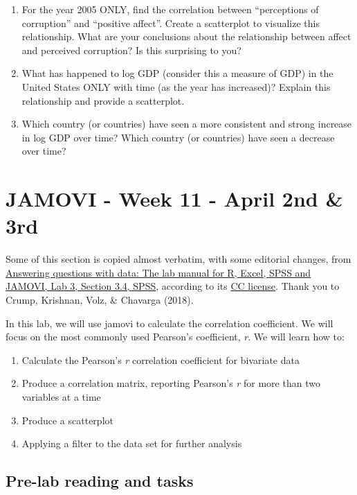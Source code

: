 \documentclass[
]{book}
\providecommand{\tightlist}{%
  \setlength{\itemsep}{0pt}\setlength{\parskip}{0pt}}
\begin{document}
\begin{enumerate}
\def\labelenumi{\arabic{enumi}.}
\item
  For the year 2005 ONLY, find the correlation between ``perceptions of corruption'' and ``positive affect''. Create a scatterplot to visualize this relationship. What are your conclusions about the relationship between affect and perceived corruption? Is this surprising to you?
\item
  What has happened to log GDP (consider this a measure of GDP) in the United States ONLY with time (as the year has increased)? Explain this relationship and provide a scatterplot.
\item
  Which country (or countries) have seen a more consistent and strong increase in log GDP over time? Which country (or countries) have seen a decrease over time?
\end{enumerate}

\hypertarget{jamovi---week-11---april-2nd-3rd}{%
\section{JAMOVI - Week 11 - April 2nd \& 3rd}\label{jamovi---week-11---april-2nd-3rd}}

Some of this section is copied almost verbatim, with some editorial changes, from \href{https://www.crumplab.com/statisticsLab/lab-3-correlation.html\#spss-3}{Answering questions with data: The lab manual for R, Excel, SPSS and JAMOVI, Lab 3, Section 3.4, SPSS}, according to its \href{https://creativecommons.org/licenses/by-sa/4.0/deed.ast}{CC license}. Thank you to Crump, Krishnan, Volz, \& Chavarga (2018).

In this lab, we will use jamovi to calculate the correlation coefficient. We will focus on the most commonly used Pearson's coefficient, \emph{r}. We will learn how to:

\begin{enumerate}
\def\labelenumi{\arabic{enumi}.}
\tightlist
\item
  Calculate the Pearson's \emph{r} correlation coefficient for bivariate data
\item
  Produce a correlation matrix, reporting Pearson's \emph{r} for more than two variables at a time
\item
  Produce a scatterplot
\item
  Applying a filter to the data set for further analysis
\end{enumerate}

\hypertarget{pre-lab-reading-and-tasks-1}{%
\subsection{Pre-lab reading and tasks}\label{pre-lab-reading-and-tasks-1}}
\end{document}
